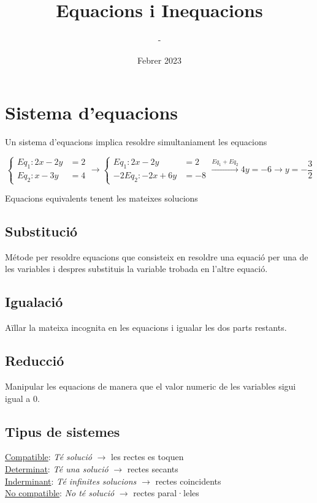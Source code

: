 \documentclass[12pt,a4paper]{article}
\title{Equacions i Inequacions}
\author{-}
\date{Febrer 2023}
\begin{document}
\maketitle
\section{Sistema d'equacions}
Un sistema d'equacions implica resoldre simultaniament les equacions

$$
\begin{cases}
    Eq_1: 2x-2y&=2\\
    Eq_2: x-3y&=4
\end{cases}\rightarrow \begin{cases}
    Eq_1: 2x-2y&=2 \\
    -2Eq_2: -2x+6y&=-8
\end{cases}\xrightarrow{Eq_1+Eq_2}4y=-6\rightarrow y=-\frac{3}{2}$$

Equacions equivalents tenent les mateixes solucions

\subsection{Substitució}
Métode per resoldre equacions que consisteix en resoldre una equació per una de les variables i despres substituis la variable trobada en l'altre equació.

\subsection{Igualació}
Aïllar la mateixa incognita en les equacions i igualar les dos parts restants.

\subsection{Reducció}
Manipular les equacions de manera que el valor numeric de les variables sigui igual a 0.

\subsection{Tipus de sistemes}
\underline{Compatible}: \textit{Té solució} $\rightarrow$ les rectes es toquen\\[5pt]
\underline{Determinat}: \textit{Té una solució} $\rightarrow$ rectes secants\\[5pt]
\underline{Inderminant}: \textit{Té infinites solucions} $\rightarrow$ rectes coincidents\\[5pt]
\underline{No compatible}: \textit{No té solució} $\rightarrow$ rectes paral·leles\\[5pt]
\end{document}
